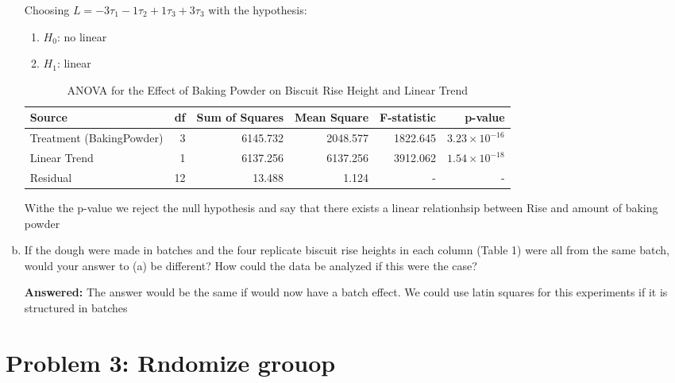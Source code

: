 \documentclass{article}
\begin{document}
\begin{enumerate}[(a)]
	      Choosing $L = -3\tau_1 -1\tau_2 + 1 \tau_3 + 3 \tau_3$ with the hypothesis:
	      \begin{enumerate}
		      \item $H_0$: no linear
		      \item $H_1$: linear
	      \end{enumerate}
	      \begin{table}[!ht]
		      \centering
		      \caption{ANOVA for the Effect of Baking Powder on Biscuit Rise Height and Linear Trend}
		      \begin{tabular}{lrrrrr}
			      \hline
			      \textbf{Source}          & \textbf{df} & \textbf{Sum of Squares} & \textbf{Mean Square} & \textbf{F-statistic} & \textbf{p-value}       \\
			      \hline
			      Treatment (BakingPowder) & 3           & 6145.732                & 2048.577             & 1822.645             & $3.23 \times 10^{-16}$ \\
			      Linear Trend             & 1           & 6137.256                & 6137.256             & 3912.062             & $1.54 \times 10^{-18}$ \\
			      Residual                 & 12          & 13.488                  & 1.124                & -                    & -                      \\
			      \hline
		      \end{tabular}
	      \end{table}
	      Withe the p-value we reject the null hypothesis and say that there exists a linear relationhsip between Rise and amount of baking powder

	\item If the dough were made in batches and the four replicate biscuit rise heights in each column (Table 1) were all from the same batch, would your answer to (a) be different?
	      How could the data be analyzed if this were the case?

	      \textbf{Answered:} The answer would be the same if would now have a batch effect. We could use latin squares for this experiments if it is structured in batches
\end{enumerate}

\section*{Problem 3: Rndomize grouop}
\end{document}
